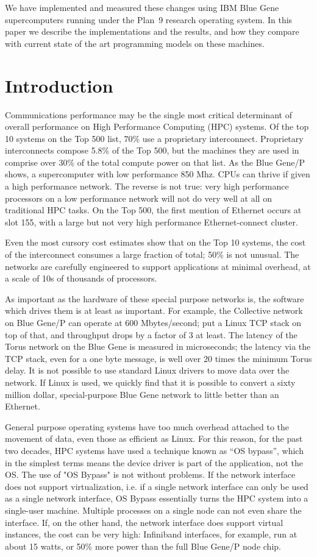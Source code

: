 \documentclass[letterpaper,twocolumn,10pt]{article}
\begin{document}
We have implemented and measured these changes using IBM Blue Gene supercomputers running under the Plan~9 research operating system. 
In this paper we describe the implementations and the results, and how they compare with current state of the art programming models on these machines. 

\section{Introduction}
Communications performance may be the single most critical determinant of overall performance on High Performance Computing (HPC) systems. Of the top 10 systems on the Top 500 list, 70\% use a proprietary interconnect. Proprietary interconnects compose 5.8\% of the Top 500, but the machines they are used in comprise over 30\% of the total compute power on that list. 
As the Blue Gene/P shows, a supercomputer with  low performance 850 Mhz. CPUs can thrive if given a high performance network. The reverse is not true: very high performance processors on a low performance network will not do very well at all on traditional HPC tasks. On the Top 500, the first 
mention of Ethernet occurs at slot 155, with a large but not very high performance Ethernet-connect cluster. 

Even the most cursory cost estimates show that on the Top 10 systems, the cost of the interconnect consumes a large fraction of total; 50\% is not unusual. The networks are carefully engineered to support applications at minimal overhead, at a scale of 10s of thousands of processors. 

As important as the hardware of these special purpose networks is, the software which drives them is at least as important. For example, the Collective network on Blue Gene/P can operate at 600 Mbytes/second; put a Linux TCP stack on top of that, and throughput
drops by a factor of 3 at least. The latency of the Torus network on the Blue Gene is measured in microseconds; the latency via the TCP stack, even for a one byte message, is well over 20 times the minimum Torus delay. It is not possible to use standard Linux drivers to move data over the network. 
If Linux is used, we quickly find that it is possible to convert a sixty million dollar, special-purpose Blue Gene network to little better than an Ethernet. 

General purpose operating systems have too much overhead attached to the movement of data, even those as efficient as Linux. 
For this reason, for the past two decades, HPC systems have used a technique known as ``OS bypass'', which in the simplest terms means the device driver is part of the application, not the OS. 
The use of "OS Bypass" is not without problems. If the network interface does not support virtualization, i.e. if a single network interface can only be used as a single network interface, OS Bypass essentially turns
the HPC system into a single-user machine. Multiple processes on a single node can not even share the interface. If, on the other hand, the network interface does support virtual instances, the cost can be very high: 
Infiniband interfaces, for example, run at about 15 watts, or 50\% more power than the full Blue Gene/P node chip. 
\end{document}
